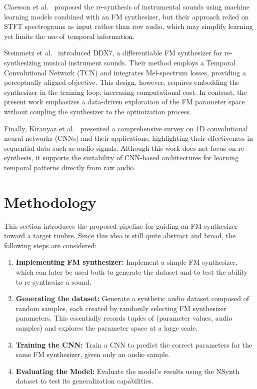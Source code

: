 \documentclass[10pt,conference]{IEEEtran}
\begin{document}
Claesson et al.\ \cite{claesson2021resynthesis} proposed the re-synthesis of instrumental sounds using machine learning models combined with an FM synthesizer, but their approach relied on STFT spectrograms as input rather than raw audio, which may simplify learning yet limits the use of temporal information.

Steinmetz et al.\ \cite{steinmetz2022ddx7} introduced DDX7, a differentiable FM synthesizer for re-synthesizing musical instrument sounds. Their method employs a Temporal Convolutional Network (TCN) and integrates Mel-spectrum losses, providing a perceptually aligned objective. This design, however, requires embedding the synthesizer in the training loop, increasing computational cost. In contrast, the present work emphasizes a data-driven exploration of the FM parameter space without coupling the synthesizer to the optimization process.

Finally, Kiranyaz et al.\ \cite{kiranyaz2021survey} presented a comprehensive survey on 1D convolutional neural networks (CNNs) and their applications, highlighting their effectiveness in sequential data such as audio signals. Although this work does not focus on re-synthesis, it supports the suitability of CNN-based architectures for learning temporal patterns directly from raw audio.

\section{Methodology} \label{sec:our_proposal}

This section introduces the proposed pipeline for guiding an FM synthesizer toward a target timbre. Since this idea is still quite abstract and broad, the following steps are considered:

\begin{enumerate}
    \item \textbf{Implementing FM synthesizer:} Implement a simple FM synthesizer, which can later be used both to generate the dataset and to test the ability to re-synthesize a sound.
    \item \textbf{Generating the dataset:} Generate a synthetic audio dataset composed of random samples, each created by randomly selecting FM synthesizer parameters. This essentially records tuples of (parameter values, audio samples) and explores the parameter space at a large scale.
    \item \textbf{Training the CNN:} Train a CNN to predict the correct parameters for the same FM synthesizer, given only an audio sample.
    \item \textbf{Evaluating the Model:} Evaluate the model's results using the NSynth dataset to test its generalization capabilities.
\end{enumerate}
\end{document}
